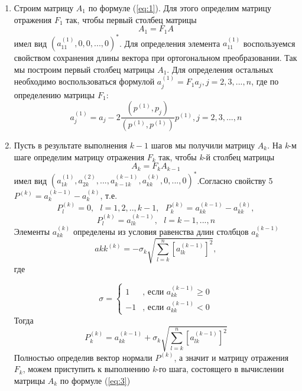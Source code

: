 \documentclass[14pt, titlepage, a4paper]{extarticle} %
\begin{document}
	\begin{enumerate}
		\item Строим матрицу $A_1$ по формуле (\ref{eq:1}). Для этого определим матрицу отражения $F_1$ так, чтобы первый столбец матрицы 
		\begin{equation}\label{eq:2}
			A_1 = F_1 A
		\end{equation}
		имел вид $(a_{11}^{(1)},0,0,...,0)^*$. Для определения элемента $a_{11}^{(1)}$ воспользуемся свойством сохранения длины вектора при ортогональном преобразовании. Так мы построим первый столбец матрицы $A_1$. Для определения остальных необходимо воспользоваться формулой $a_j^{(1)} = F_1a_j, j=2,3,...,n$, где по определению матрицы $F_1$:
		$$a_j^{(1)} = a_j - 2\frac{(p^{(1)},p_j)}{(p^{(1)},p^{(1)})}p^{(1)}, j=2,3,...,n$$
		
		\item Пусть в результате выполнения $k-1$ шагов мы получили матрицу $A_k$. На \textit{k}-м шаге определим матрицу отражения $F_k$ так, чтобы \textit{k}-й столбец матрицы
		\begin{equation}\label{eq:3}
			A_k = F_k A_{k-1}
		\end{equation}
		имел вид $(a_{1k}^{(1)},a_{2k}^{(2)},...,a_{k-1k}^{(k-1)},a_{kk}^{(k)}, 0,...,0)^*$.Согласно свойству 5 $P^{(k)} = a_k^{(k-1)}-a_k^{(k)}$, т.е. 
		$$P_l^{(k)} = 0,~~~ l=1,2,..,k-1,~~~ P_k^{(k)} = a_{kk}^{(k-1)} - a_{kk}^{(k)},$$
		$$P_l^{(k)} = a_{lk}^{(k-1)},~~~ l=k-1,...,n$$
		Элементы $a_{kk}^{(k)}$ определены из условия равенства длин столбцов $a_k^{(k-1)}$
		\begin{equation*}
		a{kk}^{(k)} = -\sigma_k\sqrt{\sum_{l=k}^{n}[ a_{lk}^{(k-1)} ]^2}, 
		\end{equation*}
		где 
		
		\begin{equation*}
		\sigma = 
		\begin{cases}
		1 &\text{, если $a_{kk}^{(k-1)}\geq 0$}\\
		-1 &\text{, если $a_{kk}^{(k-1)} < 0$}
		\end{cases}
		\end{equation*}
		Тогда 
		\begin{equation*}
			P_k^{(k)}=a_{kk}^{(k-1)}+\sigma_k\sqrt{\sum_{l=k}^{n}[ a_{lk}^{(k-1)} ]^2}
		\end{equation*}
		Полностью определив вектор нормали $P^{(k)}$, а значит и матрицу отражения $F_k$, можем приступить к выполнению \textit{k}-го шага, состоящего в вычислении матрицы $A_k$ по формуле (\ref{eq:3})
		

\end{enumerate}
\end{document}
